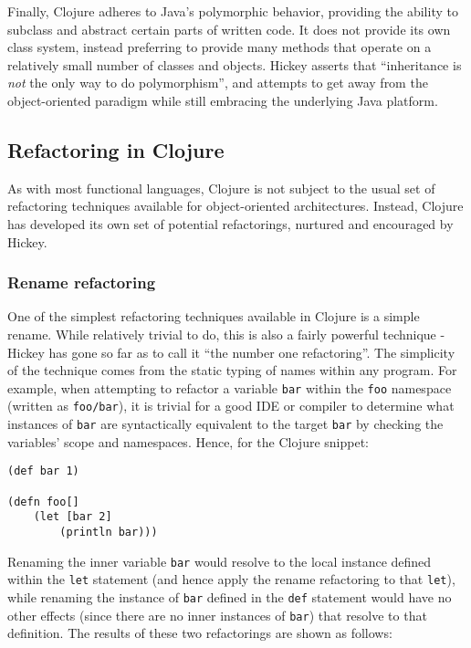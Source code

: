 \documentclass{article}
\begin{document}
Finally, Clojure adheres to Java's polymorphic behavior, providing the ability to subclass and abstract certain parts of written code. It does not provide its own class system, instead preferring to provide many methods that operate on a relatively small number of classes and objects. Hickey asserts that ``inheritance is \textit{not} the only way to do polymorphism''\cite{1}, and attempts to get away from the object-oriented paradigm while still embracing the underlying Java platform.

\subsection{Refactoring in Clojure}

As with most functional languages, Clojure is not subject to the usual set of refactoring techniques available for object-oriented architectures. Instead, Clojure has developed its own set of potential refactorings, nurtured and encouraged by Hickey.

\subsubsection{Rename refactoring}

One of the simplest refactoring techniques available in Clojure is a simple rename. While relatively trivial to do, this is also a fairly powerful technique - Hickey has gone so far as to call it ``the number one refactoring''\cite{2}. The simplicity of the technique comes from the static typing of names within any program. For example, when attempting to refactor a variable \verb!bar! within the \verb!foo! namespace (written as \verb!foo/bar!), it is trivial for a good IDE or compiler to determine what instances of \verb!bar! are syntactically equivalent to the target \verb!bar! by checking the variables' scope and namespaces. Hence, for the Clojure snippet:

\begin{verbatim}
(def bar 1)

(defn foo[]
    (let [bar 2]
        (println bar)))
\end{verbatim}

Renaming the inner variable \verb!bar! would resolve to the local instance defined within the \verb!let! statement (and hence apply the rename refactoring to that \verb!let!), while renaming the instance of \verb!bar! defined in the \verb!def! statement would have no other effects (since there are no inner instances of \verb!bar!) that resolve to that definition. The results of these two refactorings are shown as follows:
\end{document}
